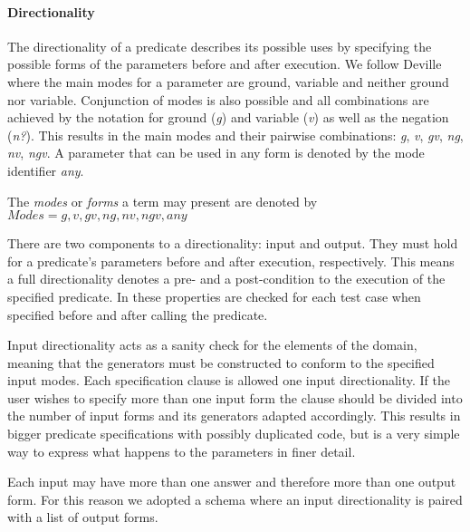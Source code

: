 \paragraph{\bf Directionality}

The directionality of a predicate describes its possible uses by
specifying the possible forms of the parameters before and after
execution.
%
We follow Deville~\cite{Deville1990logprog} where the main modes for a
parameter are ground, variable and neither ground
nor variable.
%
Conjunction of modes is also possible and all combinations are achieved
by the notation for ground (\emph{g}) and variable (\emph{v}) as well as
the negation (\emph{n?}).
%
This results in the main modes and their pairwise combinations: \emph{g},
\emph{v}, \emph{gv},  \emph{ng}, \emph{nv}, \emph{ngv}.
%
A parameter that can be used in any form is denoted by the mode
identifier \emph{any}.


\begin{definition}
\label{def:modes}
The \emph{modes} or \emph{forms} a term may present are denoted by\\
 $Modes = {g, v, gv, ng, nv, ngv, any}$
\end{definition}


There are two components to a directionality: input and output.
%
They must hold for a predicate's parameters before and after execution,
respectively.
%
This means a full directionality denotes a pre- and a post-condition to
the execution of the specified predicate.
%
In \plqc{} these properties are checked for each test case when
specified before and after calling the predicate.


Input directionality acts as a sanity check for the elements of the
domain, meaning that the generators must be constructed to conform to the
specified input modes.
%
Each specification clause is allowed one input directionality.
%
If the user wishes to specify more than one input form the clause should
be divided into the number of input forms and its generators adapted
accordingly.
%
This results in bigger predicate specifications with possibly
duplicated code, but is a very simple way to express what happens to the
parameters in finer detail.


Each input may have more than one answer and therefore more than one
output form.
%
For this reason we adopted a schema where an input directionality is
paired with a list of output forms.


